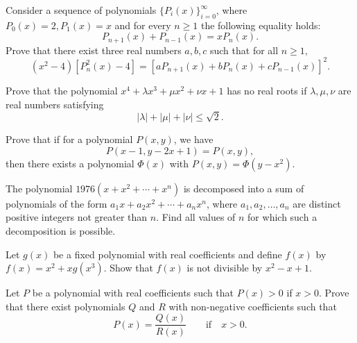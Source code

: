 \begin{question}[name={1971 IMO Shortlist}]
    Consider a sequence of polynomials $\{P_i(x)\}_{i=0}^{\infty}$, where $P_0(x) = 2, P_1(x) = x$ and for every $n \geq 1$ the following equality holds: \[P_{n+1}(x) + P_{n-1}(x) = xP_n(x).\]
    Prove that there exist three real numbers $a, b, c$ such that for all $n \geq 1,$ \[(x^2 - 4)[P_n^2(x) - 4] = [aP_{n+1}(x) + bP_n(x) + cP_{n-1}(x)]^2.\]
\end{question}

\begin{question}[name={1971 IMO Shortlist}]
    Prove that the polynomial $x^4+\lambda x^3+\mu x^2+\nu x+1$ has no real roots if $\lambda, \mu , \nu $ are real numbers satisfying 
    \[|\lambda|+|\mu|+|\nu|\le \sqrt{2}.\]
\end{question}

\begin{question}[name={1976 IMO Longlist}]
    Prove that if for a polynomial $P(x, y)$, we have
\[P(x - 1, y - 2x + 1) = P(x, y),\]
then there exists a polynomial $\Phi(x)$ with $P(x, y) = \Phi(y - x^2).$
\end{question}


\begin{question}[name={1976 IMO Longlist}]
    The polynomial $1976(x+x^2+ \cdots +x^n)$ is decomposed into a sum of polynomials of the form $a_1x + a_2x^2 + \cdots + a_nx^n$, where $a_1, a_2, \ldots , a_n$ are distinct positive integers not greater than $n$. Find all values of $n$ for which such a decomposition is possible.	
\end{question}

\begin{question}[name={1976 IMO Longlist}]
    Let $g(x)$ be a fixed polynomial with real coefficients and define $f(x)$ by $f(x) =x^2 + xg(x^3)$. Show that $f(x)$ is not divisible by $x^2 - x + 1$.
\end{question}

\begin{question}[name={1976 IMO Longlist}]
    Let $P$ be a polynomial with real coefficients such that $P(x) > 0$ if $x > 0$. Prove that there exist polynomials $Q$ and $R$ with non-negative coefficients such that \[P(x) = \frac{Q(x)}{R(x)} \qquad \text{if} \quad x > 0.\]
\end{question}

